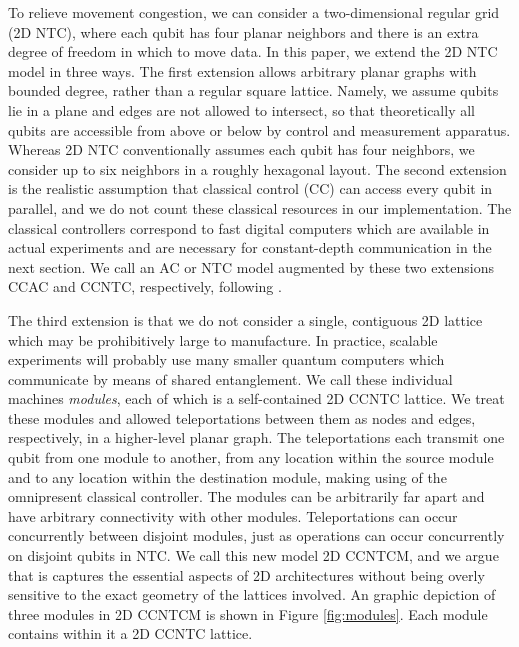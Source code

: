 \documentclass[twoside]{article}
\begin{document}
To relieve movement congestion,
we can consider a two-dimensional regular grid
(2D NTC), where each
qubit has four planar neighbors and 
there is an extra degree of freedom
in which to move data.
In this paper, we extend the \textsc{2D NTC} model in three ways.
The first extension allows arbitrary planar graphs
with bounded degree, rather than a regular square lattice.
Namely, we assume qubits lie in a plane and edges are not allowed to intersect,
so that theoretically all qubits are accessible from above
or below by control and measurement apparatus.
Whereas 2D NTC conventionally assumes each qubit
has four neighbors, we consider up to six neighbors in a roughly hexagonal
layout. The second extension is the realistic assumption
that classical control (CC) can
access every qubit in parallel, and we do not count these classical
resources in our implementation. The classical controllers
correspond to fast digital computers which are
available in actual experiments and are necessary for constant-depth
communication in the next section.
We call an AC or NTC model augmented by these two extensions
\textsc{CCAC} and \textsc{CCNTC}, respectively, following
\cite{Rosenbaum2012}.

The third extension is that we do not consider a single, contiguous
2D lattice which may be prohibitively large to manufacture. In practice,
scalable experiments will probably use many
smaller quantum computers which communicate by means of shared
entanglement. We call these individual machines \emph{modules}, each of
which is a self-contained \textsc{2D CCNTC} lattice. We treat these modules
and allowed teleportations between them as nodes and edges, respectively,
in a higher-level planar graph. The teleportations each transmit one qubit
from one module to another, from any location within the source module and
to any location within the destination module, making using of the
omnipresent classical controller. The modules can be arbitrarily far
apart and have arbitrary
connectivity with other modules. Teleportations can occur concurrently
between disjoint modules, just as operations can occur concurrently on
disjoint qubits in NTC. We call this new model \textsc{2D CCNTCM},
and we argue that is captures the essential aspects of 2D architectures
without being overly sensitive to the exact geometry of the lattices involved.
An graphic depiction of three modules in \textsc{2D CCNTCM} is shown in
Figure \ref{fig:modules}. Each module contains within it a
\textsc{2D CCNTC} lattice.
\end{document}

